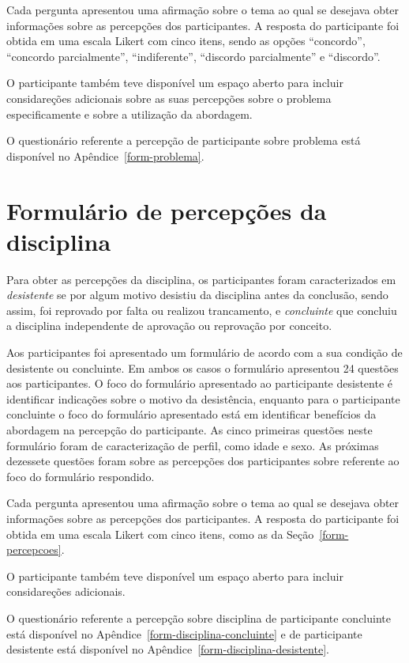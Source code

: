 Cada pergunta apresentou uma afirmação sobre o tema ao qual se desejava obter informações sobre as
percepções dos participantes.
A resposta do participante foi obtida em uma escala Likert com cinco itens, sendo as opções
``concordo'', ``concordo parcialmente'', ``indiferente'', ``discordo parcialmente'' e ``discordo''.

O participante também teve disponível um espaço aberto para incluir considareções adicionais sobre
as suas percepções sobre o problema especificamente e sobre a utilização da abordagem.

O questionário referente a percepção de participante sobre problema está disponível no
Apêndice~\ref{form-problema}.

\section{Formulário de percepções da disciplina}
\label{form-disciplinas}
Para obter as percepções da disciplina, os participantes foram caracterizados em \textit{desistente}
se por algum motivo desistiu da disciplina antes da conclusão, sendo assim, foi reprovado por
falta ou realizou trancamento, e \textit{concluinte} que concluiu a disciplina independente
de aprovação ou reprovação por conceito.

Aos participantes foi apresentado um formulário de acordo com a sua condição de desistente
ou concluinte.
Em ambos os casos o formulário apresentou 24 questões aos participantes.
O foco do formulário apresentado ao participante desistente é identificar indicações
sobre o motivo da desistência, enquanto para o participante concluinte o foco do
formulário apresentado está em identificar benefícios da abordagem na percepção
do participante.
As cinco primeiras questões neste formulário foram de caracterização de perfil, como
idade e sexo.
As próximas dezessete questões foram sobre as percepções dos participantes sobre referente
ao foco do formulário respondido.

Cada pergunta apresentou uma afirmação sobre o tema ao qual se desejava obter informações sobre as
percepções dos participantes.
A resposta do participante foi obtida em uma escala Likert com cinco itens, como as da Seção~\ref{form-percepcoes}.

O participante também teve disponível um espaço aberto para incluir considareções adicionais.

O questionário referente a percepção sobre disciplina de participante
concluinte está disponível no Apêndice~\ref{form-disciplina-concluinte}
e de participante desistente está disponível no
Apêndice~\ref{form-disciplina-desistente}.

